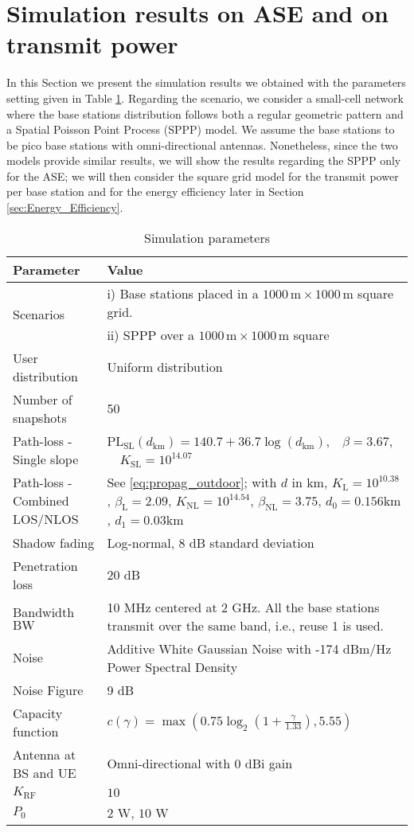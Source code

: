 \documentclass[twocoumn]{IEEEtran}
\begin{document}
\section{Simulation results on ASE and on transmit power} \label{sec:Simulation_Results_part_I}


In this Section we present the simulation results we obtained with
the parameters setting given in Table \ref{table:simulation-parameters}.
Regarding the scenario, we consider a small-cell network where the
base stations distribution follows both a regular geometric
pattern and a Spatial Poisson Point Process (SPPP) model. We assume the
base stations to be pico base stations with omni-directional antennas. Nonetheless, since the two models provide similar results, we will show the results regarding the SPPP only for the ASE; we will then consider the square grid model for the transmit power per base station and for the energy efficiency later in Section \ref{sec:Energy_Efficiency}.

\begin{table}[tbph]
\caption{Simulation parameters}
\label{table:simulation-parameters}
\centering \begin{tabular}{|p{2.55cm}|p{5.5cm}|}
\hline 
\textbf{Parameter}  & \textbf{Value}\tabularnewline
\hline 
\hline 
\multirow{2}{*}{Scenarios}  & i) Base stations placed in a $1000\,\mathrm{m}\times1000\,\mathrm{m}$
square grid.\tabularnewline
\hline 
 & ii) SPPP over a $1000\,\mathrm{m}\times1000\,\mathrm{m}$ square\tabularnewline
\hline 
User distribution  & Uniform distribution \tabularnewline
\hline 
Number of snapshots  & 50\tabularnewline
\hline 
Path-loss - Single slope & \multirow{1}{5.5cm}{$\mathrm{PL}_{\mathrm{SL}}(d_{\mathrm{km}})=140.7+36.7\log(d_{\mathrm{km}})$,~~$\beta=3.67$, ~~$K_{\mathrm{SL}}=10^{14.07}$  \cite{3GPP36814}}\tabularnewline
\hline 
Path-loss - Combined LOS/NLOS & See \eqref{eq:propag_outdoor}; with $d$ in km, $K_{\mathrm{L}}=10^{10.38}$, $\beta_{\mathrm{L}}=2.09$,
$K_{\mathrm{NL}}=10^{14.54}$, $\beta_{\mathrm{NL}}=3.75$, $d_0 =0.156\mathrm{km}$, $d_1 = 0.03\mathrm{km}$ \;\cite{3GPP36814}\tabularnewline
\hline 
Shadow fading  & Log-normal, 8 dB standard deviation \cite{3GPP36814}\tabularnewline
\hline 
Penetration loss  & 20 dB \cite{3GPP36814}\tabularnewline
\hline 
Bandwidth $\mathrm{BW}$ & 10 MHz centered at 2 GHz. All the base stations transmit over the
same band, i.e., reuse 1 is used.\tabularnewline
\hline 
Noise  & Additive White Gaussian Noise with -174 dBm/Hz Power Spectral Density\tabularnewline
\hline 
Noise Figure  & 9 dB\tabularnewline
\hline 
Capacity function  & $c(\gamma)=\max\left(0.75\log_{2}\left(1+\frac{\gamma}{1.33}\right),5.55\right)$
\cite{Harri2009}\tabularnewline
\hline 
Antenna at BS and UE  & Omni-directional with 0 dBi gain\tabularnewline
\hline 
$K_{\mathrm{RF}}$ & $10$ \cite{Auer2011}\tabularnewline
\hline 
$P_{0}$ & $2$ W, $10$ W \cite{Auer2011}\tabularnewline
\hline 
\end{tabular}

\end{table}
\end{document}

